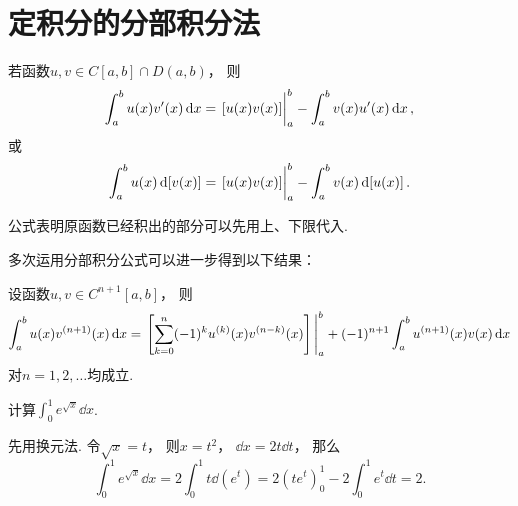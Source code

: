 \section{定积分的分部积分法}
\begin{theorem}
若函数\(u,v \in C[a,b] \cap D(a,b)\)，
则\begin{equation}
	\int_a^b u(x) v'(x) \dd{x}
	= \eval{[u(x) v(x)]}_a^b
	- \int_a^b v(x) u'(x) \dd{x},
\end{equation}
或\begin{equation}
	\int_a^b u(x) \dd{[v(x)]}
	= \eval{[u(x) v(x)]}_a^b
	- \int_a^b v(x) \dd{[u(x)]}.
\end{equation}
\end{theorem}
公式表明原函数已经积出的部分可以先用上、下限代入.

多次运用分部积分公式可以进一步得到以下结果：
\begin{corollary}
设函数\(u,v \in C^{n+1}[a,b]\)，
则\[
	\int_a^b u(x) v^{(n+1)}(x) \dd{x}
	= \eval{\left[
		\sum_{k=0}^n (-1)^k u^{(k)}(x) v^{(n-k)}(x)
	\right]}_a^b
	+ (-1)^{n+1} \int_a^b u^{(n+1)}(x) v(x) \dd{x}
\]对\(n=1,2,\dotsc\)均成立.
\end{corollary}

\begin{example}
计算\(\int_0^1 e^{\sqrt{x}} \dd{x}\).
\begin{solution}
先用换元法.
令\(\sqrt{x}=t\)，
则\(x=t^2\)，
\(\dd{x} = 2t\dd{t}\)，
那么\[
	\int_0^1 e^{\sqrt{x}} \dd{x}
	= 2 \int_0^1 t \dd(e^t)
	= 2 (t e^t)_0^1 - 2 \int_0^1 e^t \dd{t}
	= 2.
\]
\end{solution}
\end{example}

